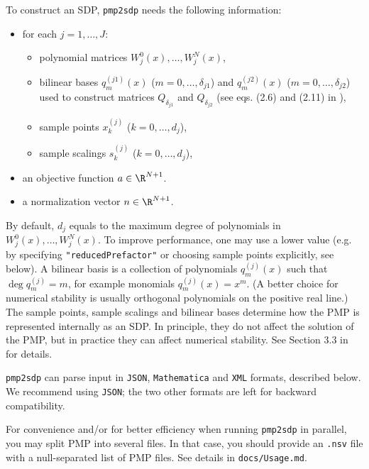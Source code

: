 \documentclass[12pt]{article}
\numberwithin{equation}{section}
\begin{document}
To construct an SDP, \texttt{pmp2sdp} needs the following information:
\begin{itemize}
	\item for each $j=1,\dots,J$:
	\begin{itemize}
		\item polynomial matrices $W^0_j(x),\dots,W^N_j(x)$,
		\item bilinear bases $q_m^{(j1)}(x)$ ($m=0,\dots,\delta_{j1}$) 
			and $q_m^{(j2)}(x)$ ($m=0,\dots,\delta_{j2}$)
			used to construct matrices $Q_{\delta_{j1}}$ and $Q_{\delta_{j2}}$
			(see eqs. (2.6) and (2.11) in \cite{DSD}),
		\item sample points $x_k^{(j)}$ ($k=0,\dots,d_j$),
		\item sample scalings $s_k^{(j)}$ ($k=0,\dots,d_j$),
	\end{itemize}
	\item an objective function $a\in \R^{N+1}$.
	\item a normalization vector $n\in \R^{N+1}$.
\end{itemize}
By default, $d_j$ equals to the maximum degree of polynomials in $W^0_j(x),\dots,W^N_j(x)$.
To improve performance, one may use a lower value (e.g. by specifying \texttt{"reducedPrefactor"} or choosing sample points explicitly, see below).
A bilinear basis is a collection of polynomials $q_m^{(j)}(x)$ such that $\deg q_m^{(j)} = m$, for example monomials $q_m^{(j)}(x)=x^m$.  (A better choice for numerical stability is usually orthogonal polynomials on the positive real line.)  The sample points, sample scalings and bilinear bases determine how the PMP is represented internally as an SDP.  In principle, they do not affect the solution of the PMP, but in practice they can affect numerical stability.
See Section 3.3 in \cite{DSD} for details.


\texttt{pmp2sdp} can parse input in \texttt{JSON}, \texttt{Mathematica} and \texttt{XML} formats, described below.
We recommend using \texttt{JSON}; the two other formats are left for backward compatibility.

For convenience and/or for better efficiency when running \texttt{pmp2sdp} in parallel,
you may split PMP into several files.
In that case, you should provide an \texttt{.nsv} file with a null-separated list of PMP files.
See details in \texttt{docs/Usage.md}.
\end{document}
